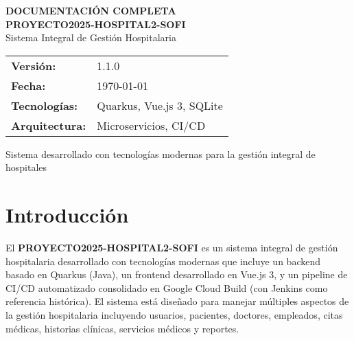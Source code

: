 \documentclass[12pt,a4paper]{article}
\begin{document}
\begin{titlepage}
\centering
\vspace*{2cm}

{\Huge\bfseries DOCUMENTACIÓN COMPLETA}\\[0.5cm]
{\Huge\bfseries PROYECTO2025-HOSPITAL2-SOFI}\\[2cm]

{\Large Sistema Integral de Gestión Hospitalaria}\\[1cm]

\vspace{2cm}

\begin{tabular}{ll}
\textbf{Versión:} & 1.1.0 \\
\textbf{Fecha:} & \today \\
\textbf{Tecnologías:} & Quarkus, Vue.js 3, SQLite \\
\textbf{Arquitectura:} & Microservicios, CI/CD \\
\end{tabular}

\vfill

{\large Sistema desarrollado con tecnologías modernas para la gestión integral de hospitales}

\end{titlepage}

\tableofcontents
\newpage

\section{Introducción}

El \textbf{PROYECTO2025-HOSPITAL2-SOFI} es un sistema integral de gestión hospitalaria desarrollado con tecnologías modernas que incluye un backend basado en Quarkus (Java), un frontend desarrollado en Vue.js 3, y un pipeline de CI/CD automatizado consolidado en Google Cloud Build (con Jenkins como referencia histórica). El sistema está diseñado para manejar múltiples aspectos de la gestión hospitalaria incluyendo usuarios, pacientes, doctores, empleados, citas médicas, historias clínicas, servicios médicos y reportes.
\end{document}
